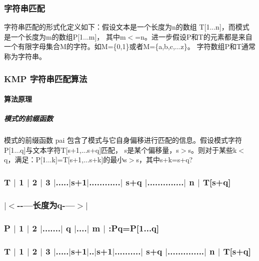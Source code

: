\subsubsection*{字符串匹配}

字符串匹配的形式化定义如下：假设文本是一个长度为n的数组 T\mbox{[}1...n\mbox{]}，而模式是一个长度为m的数组\+P\mbox{[}1...m\mbox{]}， 其中m$<$=n。进一步假设\+P和\+T的元素都是来自一个有限字母集合\+M的字符。如\+M=\{0,1\}或者\+M=\{a,b,c,...z\}。 字符数组\+P和\+T通常称为字符串。

\subsubsection*{K\+M\+P 字符串匹配算法}

\paragraph*{算法原理}

\subparagraph*{模式的前缀函数}

模式的前缀函数 pai 包含了模式与它自身偏移进行匹配的信息。假设模式字符\+P\mbox{[}1...q\mbox{]}与文本字符\+T\mbox{[}s+1,...s+q\mbox{]}匹配， s\textquotesingle{}是某个偏移量，s\textquotesingle{}$>$s。则对于某些k$<$q，满足：\+P\mbox{[}1...k\mbox{]}=T\mbox{[}s\textquotesingle{}+1,...s\textquotesingle{}+k\mbox{]}的最小s\textquotesingle{}$>$s，其中s\textquotesingle{}+k=s+q? 

 \subsubsection*{T $\vert$ 1 $\vert$ 2 $\vert$ 3 $\vert$.....$\vert$s+1$\vert$............$\vert$ s+q $\vert$..............$\vert$ n $\vert$ T\mbox{[}s+q\mbox{]} }

\subsubsection*{$\vert$$<$-\/-\/---长度为q-\/---$>$$\vert$ }

\subsubsection*{P $\vert$ 1 $\vert$ 2 $\vert$.......$\vert$ q $\vert$....$\vert$ m $\vert$ \+:Pq=P\mbox{[}1...q\mbox{]} }



 \subsubsection*{T $\vert$ 1 $\vert$ 2 $\vert$ 3 $\vert$.....$\vert$s+1$\vert$..$\vert$s\textquotesingle{}+1$\vert$..........$\vert$ s+q $\vert$..............$\vert$ n $\vert$ T\mbox{[}s+q\mbox{]} }

